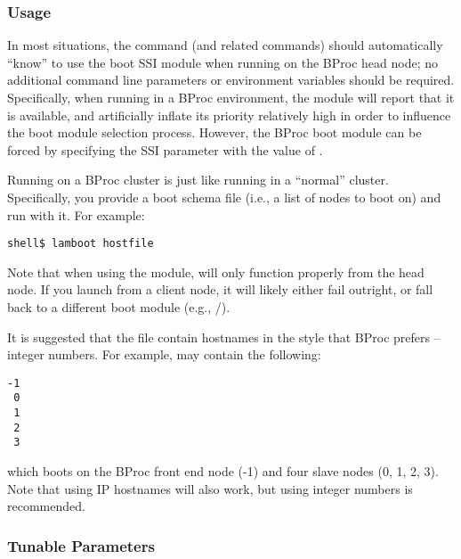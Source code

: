 
\subsubsection{Usage}

In most situations, the  command (and related commands)
should automatically ``know'' to use the  boot SSI module
when running on the BProc head node; no additional command line
parameters or environment variables should be required.  
%
Specifically, when running in a BProc environment, the 
module will report that it is available, and artificially inflate its
priority relatively high in order to influence the boot module
selection process.
%
However, the BProc boot module can be forced by specifying the
 SSI parameter with the value of
.

Running  on a BProc cluster is just like running
 in a ``normal'' cluster.  Specifically, you provide a
boot schema file (i.e., a list of nodes to boot on) and run
 with it.  For example:

\lstset{style=lam-cmdline}
\begin{lstlisting}
shell$ lamboot hostfile
\end{lstlisting}

Note that when using the  module,  will only
function properly from the head node.  If you launch 
from a client node, it will likely either fail outright, or fall back
to a different boot module (e.g., /).

It is suggested that the  file contain hostnames in the
style that BProc prefers -- integer numbers.  For example,
 may contain the following:

\lstset{style=lam-shell}
\begin{lstlisting}
-1
 0
 1
 2
 3
\end{lstlisting}

\noindent which boots on the BProc front end node (-1) and four slave
nodes (0, 1, 2, 3).  Note that using IP hostnames will also work, but
using integer numbers is recommended.


\subsubsection{Tunable Parameters}

